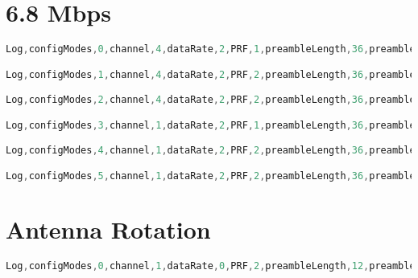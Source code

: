 \section{6.8 Mbps}
\begin{lstlisting}[caption={Configurations for Measurement Plan MP\_Distance, 6.8 Mbps}, label={app:ConfigurationsforMeasurementPlanMPDistance6.8Mbps}, language=C]
Log,configModes,0,channel,4,dataRate,2,PRF,1,preambleLength,36,preambleCodes,7,smartPower,1,nonStandardSFD,0

Log,configModes,1,channel,4,dataRate,2,PRF,2,preambleLength,36,preambleCodes,17,smartPower,1,nonStandardSFD,1

Log,configModes,2,channel,4,dataRate,2,PRF,2,preambleLength,36,preambleCodes,18,smartPower,1,nonStandardSFD,1

Log,configModes,3,channel,1,dataRate,2,PRF,1,preambleLength,36,preambleCodes,1,smartPower,1,nonStandardSFD,0

Log,configModes,4,channel,1,dataRate,2,PRF,2,preambleLength,36,preambleCodes,9,smartPower,1,nonStandardSFD,1

Log,configModes,5,channel,1,dataRate,2,PRF,2,preambleLength,36,preambleCodes,12,smartPower,1,nonStandardSFD,1
\end{lstlisting}

\section{Antenna Rotation}
\begin{lstlisting}[caption={Configurations for Measurement Plan MP\_Distance, Antenna Rotation}, label={app:ConfigurationsforMeasurementPlanMPDistanceAntennaRotation}, language=C]
Log,configModes,0,channel,1,dataRate,0,PRF,2,preambleLength,12,preambleCodes,9,smartPower,0,nonStandardSFD,0
\end{lstlisting}

